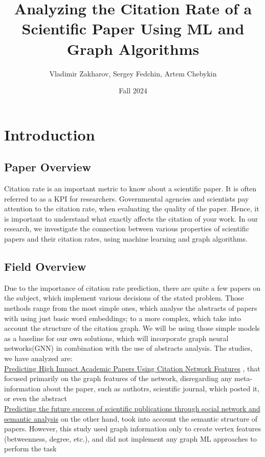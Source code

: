 \documentclass{article}
\title{Analyzing the Citation Rate of a Scientific Paper Using ML and Graph Algorithms}
\author{Vladimir Zakharov, Sergey Fedchin, Artem Chebykin}
\date{Fall 2024}
\newcommand\tab[1][1cm]{\hspace*{#1}}
\begin{document}
\maketitle

\tableofcontents

\newpage
\section{Introduction}

\subsection{Paper Overview}

\tab Citation rate is an important metric to know about a scientific paper. It is often referred to as a KPI for researchers. Governmental agencies and scientists pay attention to the citation rate, when evaluating the quality of the paper. Hence, it is important to understand what exactly affects the citation of your work. In our research, we investigate the connection between various properties of scientific papers and their citation rates, using machine learning and graph algorithms. \\

\subsection{Field Overview}
\tab Due to the importance of citation rate prediction, there are quite a few papers on the subject, which implement various decisions of the stated problem. Those methods range from the most simple ones, which analyse the abstracts of papers with using just basic word embeddings; to a more complex, which take into account the structure of the citation graph. We will be using those simple models as a baseline for our own solutions, which will incorporate graph neural networks(GNN) in combination with the use of abstracts analysis. The studies, we have analyzed are: \\

\tab \href{https://link.springer.com/chapter/10.1007/978-3-642-40319-4_2?fromPaywallRec=false}{Predicting High Impact Academic Papers Using Citation Network Features} , that focused primarily on the graph features of the network, disregarding any meta-information about the paper, such as authotrs, scientific journal, which posted it, or even the abstract\\

\tab \href{https://link.springer.com/article/10.1007/s11192-020-03479-5?fromPaywallRec=true}{Predicting the future success of scientific publications through social network and semantic analysis} on the other hand, took into account the semantic structure of papers. However, this study used graph information only to create vertex features (betweenness, degree, etc.), and did not implement any graph ML approaches to perform the task\\
\end{document}
